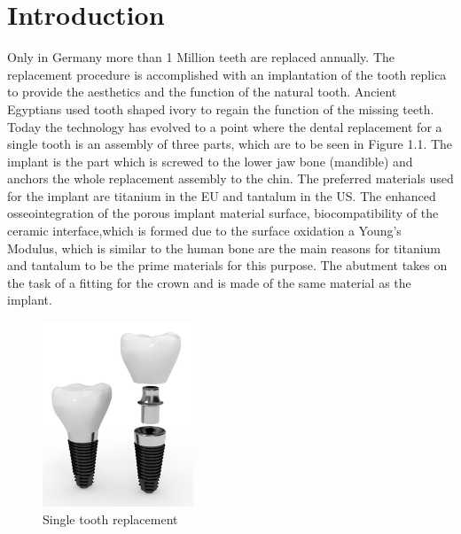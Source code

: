 \cleardoublepage
{}


\chapter{Introduction}
\label{sec:problemstellung}
 Only in Germany more than 1 Million teeth are replaced annually. The replacement procedure is accomplished with an implantation of the tooth replica to provide the aesthetics and the function of the natural tooth. Ancient Egyptians used tooth shaped ivory to regain the function of the missing teeth. Today the technology has evolved to a point where the dental replacement for a single tooth is an assembly of three parts, which  are to be seen in Figure 1.1. The implant is the part which is screwed to the lower jaw bone (mandible) and anchors the whole replacement assembly to the chin. The preferred materials used for the implant are titanium in the EU and tantalum in the US. The enhanced osseointegration of the porous implant material surface, biocompatibility of the ceramic interface,which is formed due to the surface oxidation a Young's Modulus, which is similar to the human bone are the main reasons for titanium and tantalum to be the prime materials for this purpose. The abutment takes on the task of a fitting  for the crown and is made of the same material as the implant.
  \begin{figure}[h]
 	\centering
 	\includegraphics[width=0.4\textwidth]{grafiken/implant.png}
 	\caption{Single tooth replacement}
 	\label{fig:implant}
 \end{figure} 
 
